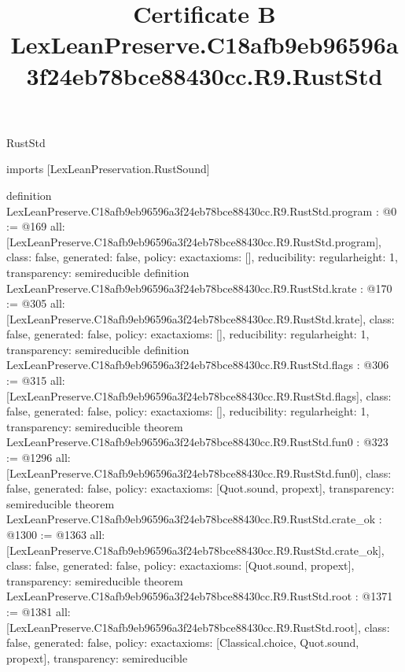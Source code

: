 \begin{lexlean}{RustStd}
\title{Certificate B LexLeanPreserve.C18afb9eb96596a3f24eb78bce88430cc.R9.RustStd}
\begin{coremodule}
imports [LexLeanPreservation.RustSound]

definition LexLeanPreserve.C18afb9eb96596a3f24eb78bce88430cc.R9.RustStd.program : @0 := @169 {
  all: [LexLeanPreserve.C18afb9eb96596a3f24eb78bce88430cc.R9.RustStd.program],
  class: false,
  generated: false,
  policy: exact{axioms: []},
  reducibility: regular{height: 1},
  transparency: semireducible
}
definition LexLeanPreserve.C18afb9eb96596a3f24eb78bce88430cc.R9.RustStd.krate : @170 := @305 {
  all: [LexLeanPreserve.C18afb9eb96596a3f24eb78bce88430cc.R9.RustStd.krate],
  class: false,
  generated: false,
  policy: exact{axioms: []},
  reducibility: regular{height: 1},
  transparency: semireducible
}
definition LexLeanPreserve.C18afb9eb96596a3f24eb78bce88430cc.R9.RustStd.flags : @306 := @315 {
  all: [LexLeanPreserve.C18afb9eb96596a3f24eb78bce88430cc.R9.RustStd.flags],
  class: false,
  generated: false,
  policy: exact{axioms: []},
  reducibility: regular{height: 1},
  transparency: semireducible
}
theorem LexLeanPreserve.C18afb9eb96596a3f24eb78bce88430cc.R9.RustStd.fun0 : @323 := @1296 {
  all: [LexLeanPreserve.C18afb9eb96596a3f24eb78bce88430cc.R9.RustStd.fun0],
  class: false,
  generated: false,
  policy: exact{axioms: [Quot.sound, propext]},
  transparency: semireducible
}
theorem LexLeanPreserve.C18afb9eb96596a3f24eb78bce88430cc.R9.RustStd.crate_ok : @1300 := @1363 {
  all: [LexLeanPreserve.C18afb9eb96596a3f24eb78bce88430cc.R9.RustStd.crate_ok],
  class: false,
  generated: false,
  policy: exact{axioms: [Quot.sound, propext]},
  transparency: semireducible
}
theorem LexLeanPreserve.C18afb9eb96596a3f24eb78bce88430cc.R9.RustStd.root : @1371 := @1381 {
  all: [LexLeanPreserve.C18afb9eb96596a3f24eb78bce88430cc.R9.RustStd.root],
  class: false,
  generated: false,
  policy: exact{axioms: [Classical.choice, Quot.sound, propext]},
  transparency: semireducible
}


\end{coremodule}
\end{lexlean}
